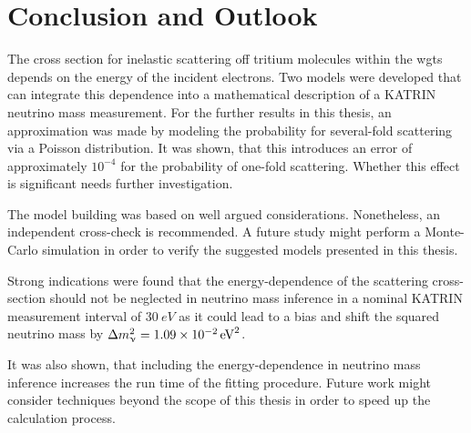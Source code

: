 \section{Conclusion and Outlook}
\label{sec:eDepScatCrossSecConclusion}
The cross section for inelastic scattering off tritium molecules within the \gls{wgts} depends on the energy of the incident electrons. Two models were developed that can integrate this dependence into a mathematical description of a KATRIN neutrino mass measurement. For the further results in this thesis, an approximation was made by modeling the probability for several-fold scattering via a Poisson distribution. It was shown, that this introduces an error of approximately $10^{-4}$ for the probability of one-fold scattering. Whether this effect is significant needs further investigation.

The model building was based on well argued considerations. Nonetheless, an independent cross-check is recommended. A future study might perform a Monte-Carlo simulation in order to verify the suggested models presented in this thesis. 

Strong indications were found that the energy-dependence of the scattering cross-section should not be neglected in neutrino mass inference in a nominal KATRIN measurement interval of $\SI{30}{eV}$ as it could lead to a bias and shift the squared neutrino mass by $\Delta m_\upnu^2 = \SI{1.09e-2}{eV^2}$.

It was also shown, that including the energy-dependence in neutrino mass inference increases the run time of the fitting procedure. Future work might consider techniques beyond the scope of this thesis in order to speed up the calculation process.